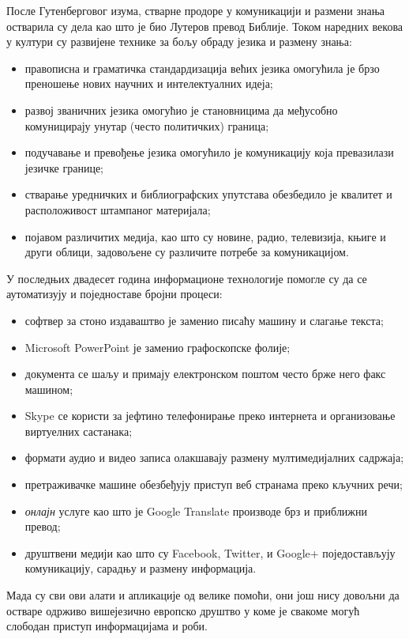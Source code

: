 {\begin{multicols}{2}
После Гутенберговог изума, стварне продоре у комуникацији и размени знања остварила су дела као што је био Лутеров превод Библије. Током наредних векова у култури су развијене технике за бољу обраду језика и размену знања:

\begin{itemize}
 \item правописна и граматичка стандардизација већих језика омогућила је брзо преношење нових научних и интелектуалних идеја;
 \item развој званичних језика омогућио је становницима да међусобно комуницирају унутар (често политичких) граница;
 \item подучавање и превођење језика омогућило је комуникацију која превазилази језичке границе;
 \item стварање уредничких и библиографских упутстава обезбедило је квалитет и расположивост штампаног материјала;
 \item појавом различитих медија, као што су новине, радио, телевизија, књиге и други облици, задовољене су различите  потребе за комуникацијом. 
\end{itemize}

У последњих двадесет година информационе технологије помогле су да се аутоматизују и поједноставе бројни процеси:

\begin{itemize}
\item софтвер за стоно издаваштво је заменио писаћу машину и слагање текста;
\item Microsoft PowerPoint је заменио графоскопске фолије;
\item документа се шаљу и примају електронском поштом често брже него факс машином;
\item Skype се користи за јефтино телефонирање преко интернета и организовање виртуелних састанака;
\item формати аудио и видео записа олакшавају размену мултимедијалних садржаја;
\item претраживачке машине обезбеђују приступ веб странама преко кључних речи;
\item \textit{онлајн} услуге као што је Google Translate производе брз и  приближни превод;
\item друштвени медији као што су Facebook, Twitter, и Google+ поједостављују  комуникацију, сарадњу и размену информација.
\end{itemize}

Мада су сви ови алати и апликације од велике помоћи, они још нису довољни да остваре одрживо вишејезично европско друштво у коме је свакоме могућ слободан приступ информацијама и роби.
 

\end{multicols}}
